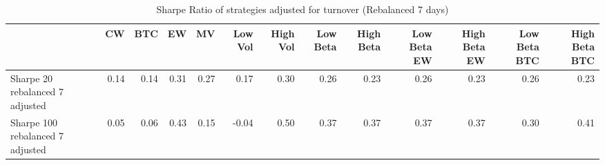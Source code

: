 \begin{table}
\centering
\caption{Sharpe Ratio of strategies adjusted for turnover (Rebalanced 7 days)}
\label{sharpe7}
\begin{tabular}{lrrrrrrrrrrrr}
\toprule
{} &   CW &  BTC &   EW &   MV &  Low Vol &  High Vol &  Low Beta &  High Beta &  Low Beta EW &  High Beta EW &  Low Beta BTC &  High Beta BTC \\
\midrule
Sharpe 20 rebalanced 7 adjusted  & 0.14 & 0.14 & 0.31 & 0.27 &     0.17 &      0.30 &      0.26 &       0.23 &         0.26 &          0.23 &          0.26 &           0.23 \\
Sharpe 100 rebalanced 7 adjusted & 0.05 & 0.06 & 0.43 & 0.15 &    -0.04 &      0.50 &      0.37 &       0.37 &         0.37 &          0.37 &          0.30 &           0.41 \\
\bottomrule
\end{tabular}
\end{table}
